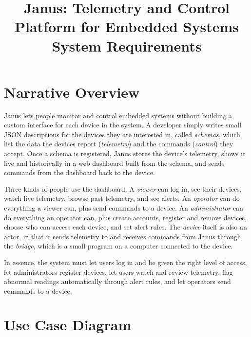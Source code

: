 \documentclass[11pt]{article}
\title{\vspace{-1.5cm}Janus: Telemetry and Control Platform for Embedded Systems\\\large System Requirements}
\author{}
\date{}
\begin{document}
\maketitle
\vspace{-1cm}

\section{Narrative Overview}
\newcommand{\sectionbreak}{\clearpage}

Janus lets people monitor and control embedded systems without building a custom interface for each device in the system. A developer simply writes small JSON descriptions for the devices they are interested in, called \emph{schemas}, which list the data the devices report (\emph{telemetry}) and the commands (\emph{control}) they accept. Once a schema is registered, Janus stores the device's telemetry, shows it live and historically in a web dashboard built from the schema, and sends commands from the dashboard back to the device.

Three kinds of people use the dashboard. A \emph{viewer} can log in, see their devices, watch live telemetry, browse past telemetry, and see alerts. An \emph{operator} can do everything a viewer can, plus send commands to a device. An \emph{administrator} can do everything an operator can, plus create accounts, register and remove devices, choose who can access each device, and set alert rules. The \emph{device} itself is also an actor, in that it sends telemetry to and receives commands from Janus through the \emph{bridge}, which is a small program on a computer connected to the device.

In essence, the system must let users log in and be given the right level of access, let administrators register devices, let users watch and review telemetry, flag abnormal readings automatically through alert rules, and let operators send commands to a device.

\section{Use Case Diagram}
\end{document}
